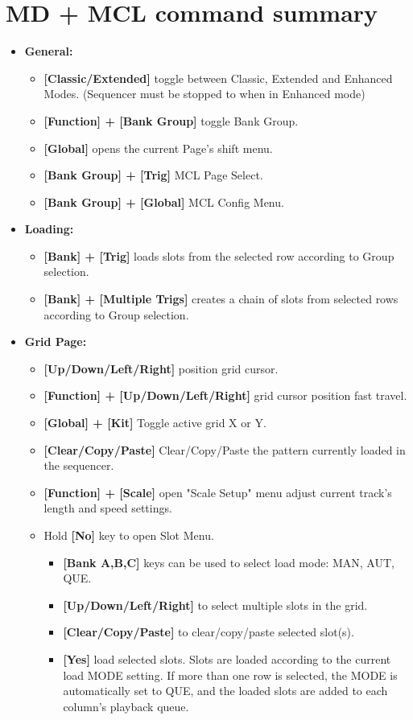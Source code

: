 \section{MD + MCL command summary}
\begin{itemize}
\item \textbf{General:}
   \begin{itemize}
      \item \textbf{[Classic/Extended] } toggle between Classic, Extended and Enhanced Modes. (Sequencer must be stopped to when in Enhanced mode)
      \item \textbf{[Function] + [Bank Group]} toggle Bank Group.
      \item \textbf{[Global]} opens the current Page's shift menu.
      \item \textbf{[Bank Group] + [Trig]} MCL Page Select.
      \item \textbf{[Bank Group] + [Global]} MCL Config Menu. 
 \end{itemize}
 
\item \textbf{Loading:}
   \begin{itemize}
      \item \textbf{[Bank] + [Trig]} loads slots from the selected row according to Group selection.
      \item \textbf{[Bank] + [Multiple Trigs]} creates a chain of slots from selected rows according to Group selection.
   \end{itemize}

\item \textbf{Grid Page:}
    \begin{itemize}
      \item \textbf{[Up/Down/Left/Right]} position grid cursor.
      \item \textbf{[Function] + [Up/Down/Left/Right]} grid cursor position fast travel.
      \item \textbf{[Global] + [Kit]} Toggle active grid X or Y. 
      \item \textbf{[Clear/Copy/Paste]} Clear/Copy/Paste the pattern currently loaded in the sequencer.
      \item \textbf{[Function] + [Scale]} open "Scale Setup" menu adjust current track's length and speed settings.
      \item Hold \textbf{[No]} key to open Slot Menu.
      \begin{itemize}
                \item \textbf{[Bank A,B,C]} keys can be used to select load mode: MAN, AUT, QUE.
                \item \textbf{[Up/Down/Left/Right]} to select multiple slots in the grid.
                \item \textbf{[Clear/Copy/Paste]} to clear/copy/paste selected slot(s).
                \item \textbf{[Yes]} load selected slots. Slots are loaded according to the current load MODE setting. If more than one row is selected, the MODE is automatically set to QUE, and the loaded slots are added to each column's playback queue.                
      \end{itemize}


\end{itemize}
\end{itemize}
